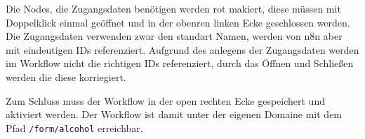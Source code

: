 Die Nodes, die Zugangsdaten benötigen werden rot makiert, diese müssen mit Doppelklick einmal
geöffnet und in der obenren linken Ecke geschlossen werden. Die Zugangsdaten verwenden zwar den
standart Namen, werden von n8n aber mit eindeutigen IDs referenziert. Aufgrund des anlegens der
Zugangsdaten werden im Workflow nicht die richtigen IDs referenziert, durch das Öffnen und Schließen
werden die diese korriegiert.

Zum Schluss muss der Workflow in der open rechten Ecke gespeichert und aktiviert werden. Der
Workflow ist damit unter der eigenen Domaine mit dem Pfad \verb|/form/alcohol| erreichbar.

